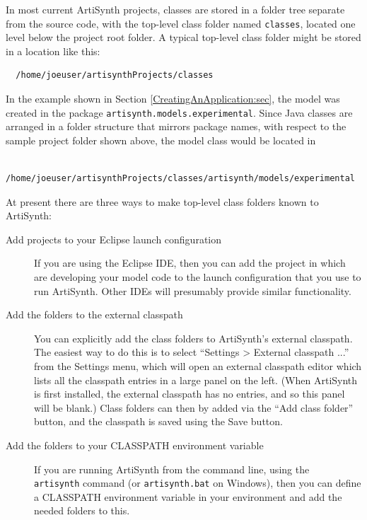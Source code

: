 In most current ArtiSynth projects, classes are stored in
a folder tree separate from the source code, with the top-level
class folder named {\tt classes}, located one level below
the project root folder. A typical top-level class folder
might be stored in a location like this:
\begin{verbatim}
  /home/joeuser/artisynthProjects/classes
\end{verbatim}
In the example shown in Section \ref{CreatingAnApplication:sec}, the
model was created in the package {\tt artisynth.models.experimental}.
Since Java classes are arranged in a folder structure that mirrors
package names, with respect to the sample project folder shown
above, the model class would be located in
\begin{verbatim}
  /home/joeuser/artisynthProjects/classes/artisynth/models/experimental
\end{verbatim}

At present there are three ways to make top-level class folders
known to ArtiSynth:

\begin{description}

\item[Add projects to your Eclipse launch configuration]\mbox{}

If you are using the Eclipse IDE, then you can add the project in
which are developing your model code to the launch configuration that
you use to run ArtiSynth. Other IDEs will presumably provide similar
functionality.

\item[Add the folders to the external classpath]\mbox{}

You can explicitly add the class folders to ArtiSynth's external
classpath. The easiest way to do this is to select ``{\sf Settings >
External classpath ...}'' from the {\sf Settings} menu, which will
open an external classpath editor which lists all the classpath
entries in a large panel on the left. (When ArtiSynth is first
installed, the external classpath has no entries, and so this panel
will be blank.) Class folders can then by added via
the {\sf ``Add class folder''} button, and the classpath is
saved using the {\sf Save} button.

\item[Add the folders to your CLASSPATH environment variable]\mbox{}

If you are running ArtiSynth from the command line, using the {\tt
artisynth} command (or {\tt artisynth.bat} on Windows), then you can
define a CLASSPATH environment variable in your environment and add
the needed folders to this.

\end{description}

